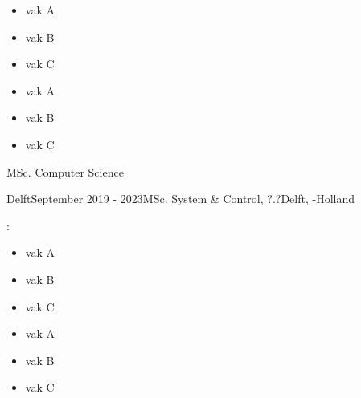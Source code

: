 \begin{rSection}{}
  \vspace{-0.1cm}
  \begin{minipage}{0.4\textwidth}
  \begin{itemize}
    \item vak A\\[-3ex]
    \item vak B\\[-3ex]
    \item vak C\\[-3ex]
  \end{itemize}
  \end{minipage}
  \begin{minipage}{0.4\textwidth}
  \begin{itemize}
    \item vak A\\[-3ex]
    \item vak B\\[-3ex]
    \item vak C\\[-3ex]
  \end{itemize}
  \end{minipage}

  \begin{experienceItem}
    {}{}{ MSc. Computer Science }{}
  \end{experienceItem}

  \begin{experienceItem}
    { Delft}{September 2019 -  2023}{MSc. System \& Control,  ?.?}{Delft, -Holland}
  \end{experienceItem}
  \begin{experienceItem}
    {}{}{:}{}
  \end{experienceItem}

  \vspace{-0.1cm}
  \begin{minipage}{0.4\textwidth}
  \begin{itemize}
    \item vak A\\[-3ex]
    \item vak B\\[-3ex]
    \item vak C\\[-3ex]
  \end{itemize}
  \end{minipage}
  \begin{minipage}{0.4\textwidth}
  \begin{itemize}
    \item vak A\\[-3ex]
    \item vak B\\[-3ex]
    \item vak C\\[-3ex]
  \end{itemize}
  \end{minipage}


\end{rSection}

